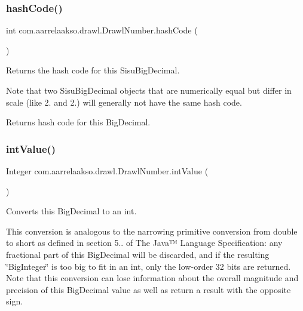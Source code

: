\subsubsection{\texorpdfstring{hash\+Code()}{hashCode()}}
{\footnotesize\ttfamily int com.\+aarrelaakso.\+drawl.\+Drawl\+Number.\+hash\+Code (\begin{DoxyParamCaption}{ }\end{DoxyParamCaption})}



Returns the hash code for this Sisu\+Big\+Decimal. 

Note that two Sisu\+Big\+Decimal objects that are numerically equal but differ in scale (like 2. and 2.) will generally not have the same hash code.

\begin{DoxyReturn}{Returns}
hash code for this Big\+Decimal. 
\end{DoxyReturn}
\mbox{\label{classcom_1_1aarrelaakso_1_1drawl_1_1_drawl_number_a8022d04415c5449344ac1e23658f8802}} 
\subsubsection{\texorpdfstring{int\+Value()}{intValue()}}
{\footnotesize\ttfamily Integer com.\+aarrelaakso.\+drawl.\+Drawl\+Number.\+int\+Value (\begin{DoxyParamCaption}{ }\end{DoxyParamCaption})\hspace{0.3cm}{\ttfamily [protected]}}



Converts this Big\+Decimal to an int. 

This conversion is analogous to the narrowing primitive conversion from double to short as defined in section 5.. of The Java™ Language Specification\+: any fractional part of this Big\+Decimal will be discarded, and if the resulting \char`\"{}\+Big\+Integer\char`\"{} is too big to fit in an int, only the low-\/order 32 bits are returned. Note that this conversion can lose information about the overall magnitude and precision of this Big\+Decimal value as well as return a result with the opposite sign.

